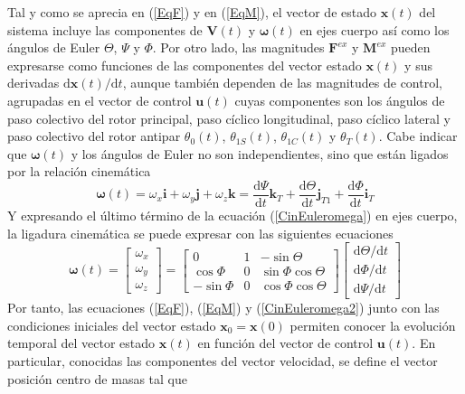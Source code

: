 Tal y como se aprecia en (\ref{EqF}) y en (\ref{EqM}), el vector de estado $\mathrm{\textbf{x}}(t)$ del sistema incluye las componentes de $\mathrm{\textbf{V}}(t)$ y $\boldsymbol{\omega}(t)$
en ejes cuerpo así como los ángulos de Euler $\Theta$, $\Psi$ y $\Phi$. Por otro lado, las magnitudes $\mathrm{\textbf{F}}^{ex}$ y $\mathrm{\textbf{M}}^{ex}$ pueden expresarse como funciones de las componentes del vector estado $\mathrm{\textbf{x}}(t)$ y sus derivadas $\mathrm{d\textbf{x}}(t)/\mathrm{d}t$, aunque también dependen de las magnitudes de control, agrupadas en el vector de control $\mathrm{\textbf{u}}(t)$ cuyas componentes son los ángulos de paso colectivo del rotor principal, paso cíclico longitudinal, paso cíclico lateral y paso colectivo del rotor antipar $\theta_0(t)$, $\theta_{1S}(t)$, $\theta_{1C}(t)$ y $\theta_T(t)$.
Cabe indicar que $\boldsymbol{\omega}(t)$ y los ángulos de Euler no son independientes, sino que están ligados por la relación cinemática
\begin{equation}
	\boldsymbol{\omega}(t)=\omega_x\textbf{i}+\omega_y\textbf{j}+\omega_z\textbf{k}=\frac{\mathrm{d}\Psi}{\mathrm{d}t}\textbf{k}_T+\frac{\mathrm{d}\Theta}{\mathrm{d}t}\textbf{j}_{T1}+\frac{\mathrm{d}\Phi}{\mathrm{d}t}\textbf{i}_T
	\label{CinEuleromega}
\end{equation}
Y expresando el último término de la ecuación (\ref{CinEuleromega}) en ejes cuerpo, la ligadura cinemática se puede expresar con las siguientes ecuaciones
\begin{equation}
	\boldsymbol{\omega}(t)=\left[
	\begin{array}{c}
	\omega_x\\
	\omega_y\\
	\omega_z
	\end{array}
	\right]=\left[	
	\begin{array}{ccc}
	0 & 1 & -\sin\Theta\\
	\cos\Phi & 0 & \sin\Phi\cos\Theta\\
	-\sin\Phi & 0 & \cos\Phi\cos\Theta
	\end{array}
	\right]\left[
	\begin{array}{c}
	\mathrm{d}\Theta/\mathrm{d}t\\
	\mathrm{d}\Phi/\mathrm{d}t\\
	\mathrm{d}\Psi/\mathrm{d}t
	\end{array}
	\right]
	\label{CinEuleromega2}
\end{equation}
Por tanto, las ecuaciones (\ref{EqF}), (\ref{EqM}) y (\ref{CinEuleromega2}) junto con las condiciones iniciales del vector estado $\mathrm{\textbf{x}_0}=\mathrm{\textbf{x}(0)}$ permiten conocer la evolución temporal del vector estado $\mathrm{\textbf{x}}(t)$ en función del vector de control $\mathrm{\textbf{u}}(t)$. En particular, conocidas las componentes del vector velocidad, se define el vector posición centro de masas tal que 
